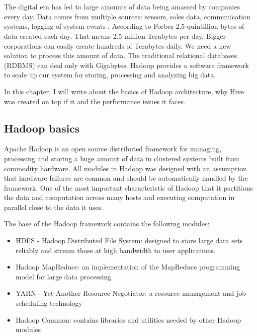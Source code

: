 \chapter{\bevezetes}


The digital era has led to large amounts of data being amassed by companies every day. Data comes from multiple sources: sensors, sales data, communication systems, logging of system events \etc. According to Forbes \cite{Forbes} 2.5 quintillion bytes of data created each day. That means 2.5 million Terabytes per day. Bigger corporations can easily create hundreds of Terabytes daily. We need a new solution to process this amount of data. The traditional relational databases (RDBMS) can deal only with Gigabytes. Hadoop provides a software framework to scale up our system for storing, processing and analyzing big data.

In this chapter, I will write about the basics of Hadoop architecture, why Hive was created on top if it and the performance issues it faces.

\section{Hadoop basics}
Apache Hadoop is an open source distributed framework for managing, processing  and storing a huge amount of data in clustered systems built from commodity hardware. All modules in Hadoop was designed with an assumption that hardware failures are common and should be automatically handled by the framework. One of the most important characteristic of Hadoop that it partitions the data and computation across many hosts and executing computation in parallel close to the data it uses.  \cite{Hadoop-wiki}

The base of the Hadoop framework contains the following modules:
\begin{itemize}
	\item HDFS - Hadoop Distributed File System: designed to store large data sets reliably and stream those at high bandwidth to user applications.
	\item Hadoop MapReduce: an implementation of the MapReduce programming model for large data processing
	\item YARN - Yet Another Resource Negotiator: a resource management and job scheduling technology
	\item Hadoop Common: contains libraries and utilities needed by other Hadoop modules
\end{itemize}
